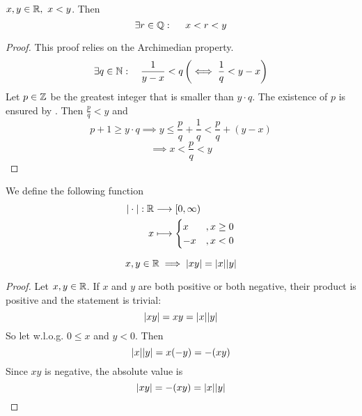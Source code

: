 \documentclass[../../script.tex]{subfiles}
\begin{document}
\begin{cor}\label{cor:densityrats}
$x, y \in \mathbb{R}, ~x < y$. Then
\[
	\exists r \in \mathbb{Q}:\quad ~x < r < y
\]
\end{cor}
\begin{proof}
This proof relies on the Archimedian property.
\begin{equation}
	\exists q \in \mathbb{N}: \quad \frac{1}{y-x} < q \left( \iff \frac{1}{q} < y - x \right)
\end{equation}
Let $p \in \mathbb{Z}$ be the greatest integer that is smaller than $y \cdot q$. The existence of $p$ is ensured by . Then $\frac{p}{q} < y$ and
\begin{equation}
	p + 1 \ge y \cdot q \implies y \le \frac{p}{q} + \frac{1}{q} < \frac{p}{q} + (y - x)
\end{equation}
\begin{equation}
	\implies x < \frac{p}{q} < y
\end{equation}
\end{proof}

\begin{defi}
We define the following function
\begin{align*}
	|\cdot|: \mathbb{R} &\longrightarrow [0, \infty) \\
	x &\longmapsto 
	\begin{cases}
		x &, x \ge 0 \\
		-x &, x < 0
	\end{cases}
\end{align*}
\end{defi}

\begin{thm}
\[
	x, y \in \mathbb{R} \implies |xy| = |x||y|
\]
\end{thm}
\begin{proof}
Let $x, y \in \mathbb{R}$. If $x$ and $y$ are both positive or both negative, their product is positive and the statement is trivial:
\begin{equation}
	\abs{xy} = xy = \abs{x} \abs{y}
\end{equation}
So let w.l.o.g. $0 \le x$ and $y < 0$. Then 
\begin{equation}
	\abs{x}\abs{y} = x(-y) = -(xy)
\end{equation}
Since $xy$ is negative, the absolute value is 
\begin{equation}
	\abs{xy} = -(xy) = \abs{x}\abs{y}
\end{equation}
\end{proof}
\end{document}

